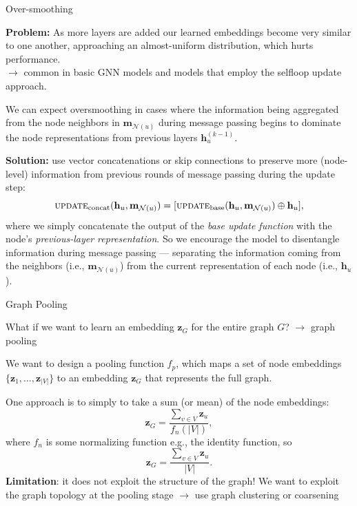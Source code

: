\documentclass[10pt, aspectratio=169, compress, protectframetitle, handout]{beamer}
\begin{document}
\begin{frame}{Over-smoothing}

    \textbf{Problem:} As more layers are added our learned embeddings become very similar to one another, approaching an \alert{almost-uniform distribution}, which \alert{hurts performance}.\\
    $\longrightarrow$ common in basic GNN models and models that employ the selfloop update approach.
    
    We can expect oversmoothing in cases where the information being aggregated from the node neighbors in $\mathbf m_{\mathcal N(u)}$ during message passing begins to \alert{dominate} the node representations from previous layers $\mathbf h_u^{(k-1)}$.
    
    \textbf{Solution:} use vector concatenations or \alert{skip connections} to preserve more (node-level) information from previous rounds of message passing during the update step:
    \begin{equation}
    \textsc{update}_\text{concat}(\mathbf h_u, \mathbf m_{\mathcal N(u)}) = [\textsc{update}_\text{base}(\mathbf h_u, \mathbf m_{\mathcal N(u)}) \oplus \mathbf h_u],
    \end{equation}
    where we simply concatenate the output of the \emph{base update function} with the node's \emph{previous-layer representation}. So we encourage the model to disentangle information during message passing --- separating the information coming from the neighbors (i.e., $\mathbf m_{\mathcal N(u)}$) from the current representation of each node (i.e., $\mathbf h_u$).
    
\end{frame}


\begin{frame}{Graph Pooling}

    What if we want to learn an embedding $\mathbf z_G$ for the entire graph $G$? $\longrightarrow$ \alert{graph pooling}
    
    We want to design a pooling function $f_p$, which maps a set of node embeddings $\{\mathbf z_1, \ldots, \mathbf z_{|V|} \}$ to an embedding $\mathbf z_G$ that represents the full graph.
    
    One approach is to simply to take a sum (or mean) of the node embeddings:
    \begin{equation}
        \mathbf z_G = \frac{\sum_{v \in V} \mathbf z_u}{f_n(|V|)},
    \end{equation}
    where $f_n$ is some normalizing function e.g., the identity function, so
    \begin{equation}
        \mathbf z_G = \frac{\sum_{v \in V} \mathbf z_u}{|V|}.
    \end{equation}
    \textbf{Limitation}: it does not exploit the structure of the graph! We want to exploit the graph topology at the pooling stage $\longrightarrow$ use \alert{graph clustering or coarsening}
    
\end{frame}
\end{document}
